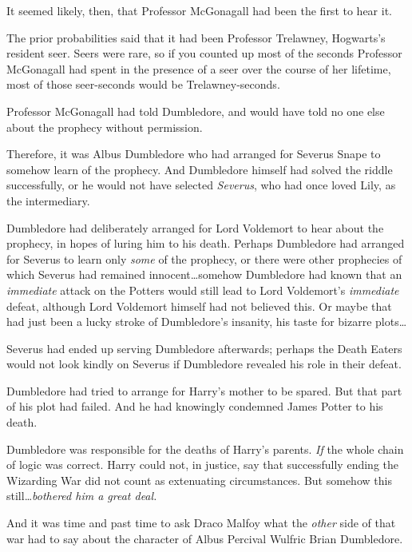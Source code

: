 It seemed likely, then, that Professor McGonagall had been the first to hear it.

The prior probabilities said that it had been Professor Trelawney, Hogwarts’s resident seer. Seers were rare, so if you counted up most of the seconds Professor McGonagall had spent in the presence of a seer over the course of her lifetime, most of those seer-seconds would be Trelawney-seconds.

Professor McGonagall had told Dumbledore, and would have told no one else about the prophecy without permission.

Therefore, it was Albus Dumbledore who had arranged for Severus Snape to somehow learn of the prophecy. And Dumbledore himself had solved the riddle successfully, or he would not have selected \emph{Severus}, who had once loved Lily, as the intermediary.

Dumbledore had deliberately arranged for Lord Voldemort to hear about the prophecy, in hopes of luring him to his death. Perhaps Dumbledore had arranged for Severus to learn only \emph{some} of the prophecy, or there were other prophecies of which Severus had remained innocent…somehow Dumbledore had known that an \emph{immediate} attack on the Potters would still lead to Lord Voldemort’s \emph{immediate} defeat, although Lord Voldemort himself had not believed this. Or maybe that had just been a lucky stroke of Dumbledore’s insanity, his taste for bizarre plots…

Severus had ended up serving Dumbledore afterwards; perhaps the Death Eaters would not look kindly on Severus if Dumbledore revealed his role in their defeat.

Dumbledore had tried to arrange for Harry’s mother to be spared. But that part of his plot had failed. And he had knowingly condemned James Potter to his death.

Dumbledore was responsible for the deaths of Harry’s parents. \emph{If} the whole chain of logic was correct. Harry could not, in justice, say that successfully ending the Wizarding War did not count as extenuating circumstances. But somehow this still…\emph{bothered him a great deal.}

And it was time and past time to ask Draco Malfoy what the \emph{other} side of that war had to say about the character of Albus Percival Wulfric Brian Dumbledore.

